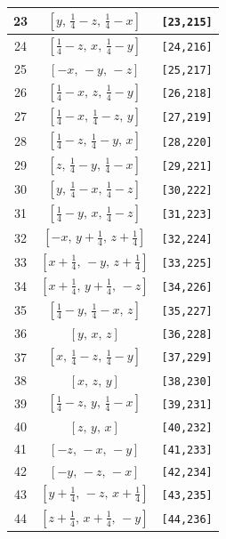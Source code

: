 \documentclass[fleqn,8pt]{jsarticle}
\begin{document}
\begin{longtable}{ccc}
23 & $\left[ y,\, \frac{1}{4} - z,\, \frac{1}{4} - x \right]$ & {\tt [23,215]} \\ \hline
24 & $\left[ \frac{1}{4} - z,\, x,\, \frac{1}{4} - y \right]$ & {\tt [24,216]} \\ \hline
25 & $\left[ - x,\, - y,\, - z \right]$ & {\tt [25,217]} \\ \hline
26 & $\left[ \frac{1}{4} - x,\, z,\, \frac{1}{4} - y \right]$ & {\tt [26,218]} \\ \hline
27 & $\left[ \frac{1}{4} - x,\, \frac{1}{4} - z,\, y \right]$ & {\tt [27,219]} \\ \hline
28 & $\left[ \frac{1}{4} - z,\, \frac{1}{4} - y,\, x \right]$ & {\tt [28,220]} \\ \hline
29 & $\left[ z,\, \frac{1}{4} - y,\, \frac{1}{4} - x \right]$ & {\tt [29,221]} \\ \hline
30 & $\left[ y,\, \frac{1}{4} - x,\, \frac{1}{4} - z \right]$ & {\tt [30,222]} \\ \hline
31 & $\left[ \frac{1}{4} - y,\, x,\, \frac{1}{4} - z \right]$ & {\tt [31,223]} \\ \hline
32 & $\left[ - x,\, y + \frac{1}{4},\, z + \frac{1}{4} \right]$ & {\tt [32,224]} \\ \hline
33 & $\left[ x + \frac{1}{4},\, - y,\, z + \frac{1}{4} \right]$ & {\tt [33,225]} \\ \hline
34 & $\left[ x + \frac{1}{4},\, y + \frac{1}{4},\, - z \right]$ & {\tt [34,226]} \\ \hline
35 & $\left[ \frac{1}{4} - y,\, \frac{1}{4} - x,\, z \right]$ & {\tt [35,227]} \\ \hline
36 & $\left[ y,\, x,\, z \right]$ & {\tt [36,228]} \\ \hline
37 & $\left[ x,\, \frac{1}{4} - z,\, \frac{1}{4} - y \right]$ & {\tt [37,229]} \\ \hline
38 & $\left[ x,\, z,\, y \right]$ & {\tt [38,230]} \\ \hline
39 & $\left[ \frac{1}{4} - z,\, y,\, \frac{1}{4} - x \right]$ & {\tt [39,231]} \\ \hline
40 & $\left[ z,\, y,\, x \right]$ & {\tt [40,232]} \\ \hline
41 & $\left[ - z,\, - x,\, - y \right]$ & {\tt [41,233]} \\ \hline
42 & $\left[ - y,\, - z,\, - x \right]$ & {\tt [42,234]} \\ \hline
43 & $\left[ y + \frac{1}{4},\, - z,\, x + \frac{1}{4} \right]$ & {\tt [43,235]} \\ \hline
44 & $\left[ z + \frac{1}{4},\, x + \frac{1}{4},\, - y \right]$ & {\tt [44,236]} \\ \hline

\end{longtable}
\end{document}
